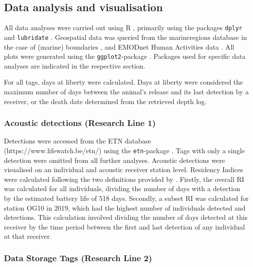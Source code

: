 \documentclass[
  authoryear,
  review,
  3p]{elsarticle}
\begin{document}
\hypertarget{data-analysis-and-visualisation}{%
\subsection{Data analysis and
visualisation}\label{data-analysis-and-visualisation}}

All data analyses were carried out using R \citep{R_2022}, primarily
using the packages \texttt{dplyr} \citep{dplyr} and \texttt{lubridate}
\citep{lubridate}. Geospatial data was queried from the marineregions
database \citep{claus_2014} in the case of (marine) boundaries
\citep[with the \texttt{mregions2}-package,][]{mregions2}, and EMODnet
Human Activities \citep{solaun_2021} data \citep[with the
\texttt{EMODnetWFS}-package,][]{EMODnetWFS}. All plots were generated
using the \texttt{ggplot2}-package \citep{ggplot2}. Packages used for
specific data analyses are indicated in the respective section.

For all tags, days at liberty were calculated. Days at liberty were
considered the maximum number of days between the animal's release and
its last detection by a receiver, or the death date determined from the
retrieved depth log.

\hypertarget{acoustic-detections-research-line-1}{%
\subsubsection{Acoustic detections (Research Line
1)}\label{acoustic-detections-research-line-1}}

Detections were accessed from the ETN database
(https://www.lifewatch.be/etn/) using the \texttt{etn}-package
\citep{etn}. Tags with only a single detection were omitted from all
further analyses. Acoustic detections were visualised on an individual
and acoustic receiver station level. Residency Indices were calculated
following the two definitions provided by \citet{kraft_2023}. Firstly,
the overall RI was calculated for all individuals, dividing the number
of days with a detection by the estimated battery life of 518 days.
Secondly, a subset RI was calculated for station OG10 in 2019, which had
the highest number of individuals detected and detections. This
calculation involved dividing the number of days detected at this
receiver by the time period between the first and last detection of any
individual at that receiver.

\hypertarget{sec-mm_dsts}{%
\subsubsection{Data Storage Tags (Research Line 2)}\label{sec-mm_dsts}}
\end{document}
